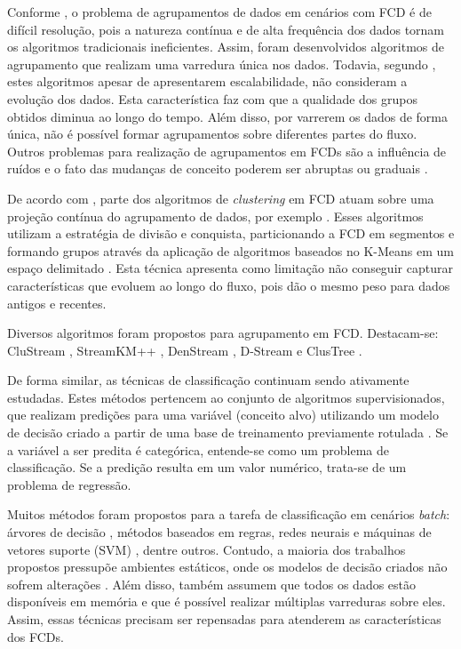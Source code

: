 \documentclass[qual, classic, a4paper]{ufbathesis}
\begin{document}
Conforme \cite{Aggarwal:2003:FCE:1315451.1315460}, o problema de agrupamentos de dados em cenários com FCD é de difícil resolução,
pois a natureza contínua e de alta frequência dos dados tornam os algoritmos tradicionais ineficientes.
Assim, foram desenvolvidos algoritmos de agrupamento que realizam uma varredura única nos dados. 
Todavia, segundo \cite{Aggarwal:2003:FCE:1315451.1315460}, estes algoritmos apesar de apresentarem escalabilidade, 
não consideram a evolução dos dados. 
Esta característica faz com que a qualidade dos grupos obtidos diminua ao longo do tempo.
Além disso, por varrerem os dados de forma única, não é possível formar agrupamentos sobre diferentes partes do fluxo.
Outros problemas para realização de agrupamentos em FCDs são a influência de ruídos e o fato das mudanças de conceito poderem ser abruptas ou graduais \cite{Khalilian:DBLP:journals/corr/abs-1006-5261}.

De acordo com \cite{Chen:Tu}, 
parte dos algoritmos de \textit{clustering} em FCD atuam sobre uma projeção contínua do agrupamento de dados, por exemplo \cite{Guha:2003:CDS:776752.776777}.
Esses algoritmos utilizam a estratégia de divisão e conquista, particionando a FCD em segmentos e 
formando grupos através da aplicação de algoritmos baseados no K-Means em um espaço delimitado \cite{Guha:2000:CDS:795666.796588}.
Esta técnica apresenta como limitação não conseguir capturar características que evoluem ao longo do fluxo, 
pois dão o mesmo peso para dados antigos e recentes.
 
Diversos algoritmos foram propostos para agrupamento em FCD. 
Destacam-se: 
CluStream \cite{Aggarwal:2003:FCE:1315451.1315460},
StreamKM++ \cite{Ackermann:2012:SCA:2133803.2184450},
DenStream \cite{Cao:Feng:Ester},
D-Stream \cite{Chen:Tu} e ClusTree \cite{Kranen:2011:CIM:2134350.2134352}.

De forma similar, as técnicas de classificação continuam sendo ativamente estudadas.
Estes métodos pertencem ao conjunto de algoritmos supervisionados, 
que realizam predições para uma variável (conceito alvo) utilizando um modelo de decisão criado a partir de uma base de treinamento previamente rotulada \cite{Kotsiantis:2007:SML:1566770.1566773}.
Se a variável a ser predita é categórica, entende-se como um problema de classificação.
Se a predição resulta em um valor numérico, trata-se de um problema de regressão.

Muitos métodos foram propostos para a tarefa de classificação em cenários \textit{batch}:
árvores de decisão \cite{Breiman:Classification_Regression_Trees},
métodos baseados em regras, 
redes neurais e máquinas de vetores suporte (SVM) \cite{Vapnik1998}, 
dentre outros.
Contudo, a maioria dos trabalhos propostos pressupõe ambientes estáticos, onde os modelos de decisão criados não sofrem alterações \cite{Aggarwal:2006:DSM:1196418}.
Além disso, também assumem que todos os dados estão disponíveis em memória e que é possível realizar múltiplas varreduras sobre eles.
Assim, essas técnicas precisam ser repensadas para atenderem as características dos FCDs.
\end{document}
